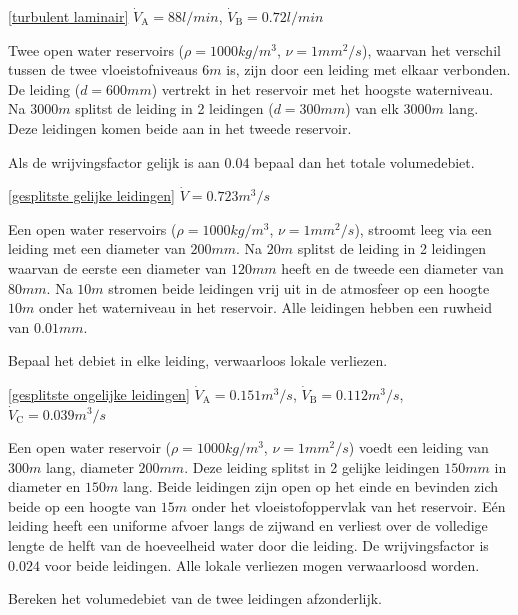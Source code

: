 \begin{antwoord}{\ref{turbulent laminair}}
	$\dot{V}_\mathrm{A} = 88 \unit{l/min}$, $\dot{V}_\mathrm{B} = 0.72 \unit{l/min}$
\end{antwoord}
\begin{toepassing}
	\label{gesplitste gelijke leidingen}
Twee open water reservoirs ($\rho=1000 \unit{kg/m^3}$, $\nu=1 \unit{mm^2/s}$), waarvan het verschil tussen de twee vloeistofniveaus $6 \unit{m}$ is, zijn door een leiding met elkaar verbonden. De leiding ($d=600 \unit{mm}$) vertrekt in het reservoir met het hoogste waterniveau. Na $3000 \unit{m}$ splitst de leiding in 2 leidingen ($d=300 \unit{mm}$) van elk $3000 \unit{m}$ lang. Deze leidingen komen beide aan in het tweede reservoir. 
		
Als de wrijvingsfactor gelijk is aan $0.04$ bepaal dan het totale volumedebiet. 
\end{toepassing}
\begin{antwoord}{\ref{gesplitste gelijke leidingen}}
	$\dot{V} = 0.723 \unit{m^3/s}$
\end{antwoord}
\begin{toepassing}[*]
	\label{gesplitste ongelijke leidingen}
Een open water reservoirs ($\rho=1000 \unit{kg/m^3}$, $\nu=1 \unit{mm^2/s}$), stroomt leeg via een leiding met een diameter van $200 \unit{mm}$. Na $20 \unit{m}$ splitst de leiding in 2 leidingen waarvan de eerste een diameter van $120 \unit{mm}$ heeft en de tweede een diameter van $80 \unit{mm}$. Na $10 \unit{m}$ stromen beide leidingen vrij uit in de atmosfeer op een hoogte $10 \unit{m}$ onder het waterniveau in het reservoir. Alle leidingen hebben een ruwheid van $0.01 \unit{mm}$.

Bepaal het debiet in elke leiding, verwaarloos lokale verliezen.
\end{toepassing}
\begin{antwoord}{\ref{gesplitste ongelijke leidingen}}
	$\dot{V}_\mathrm{A} = 0.151 \unit{m^3/s}$, $\dot{V}_\mathrm{B} = 0.112 \unit{m^3/s}$,\\
	$\dot{V}_\mathrm{C} = 0.039 \unit{m^3/s}$
\end{antwoord}
\begin{toepassing}
	\label{geperforeerde leiding debiet}
Een open water reservoir ($\rho=1000 \unit{kg/m^3}$, $\nu=1 \unit{mm^2/s}$) voedt een leiding van $300 \unit{m}$ lang, diameter $200 \unit{mm}$. Deze leiding splitst in 2 gelijke leidingen $150 \unit{mm}$ in diameter en $150 \unit{m}$ lang. Beide leidingen zijn open op het einde en bevinden zich beide op een hoogte van $15 \unit{m}$ onder het vloeistofoppervlak van het reservoir. Eén leiding heeft een uniforme afvoer langs de zijwand en verliest over de volledige lengte de helft van de hoeveelheid water door die leiding. De wrijvingsfactor is $0.024$ voor beide leidingen. Alle lokale verliezen mogen verwaarloosd worden.
		
Bereken het volumedebiet van de twee leidingen afzonderlijk. 
\end{toepassing}
